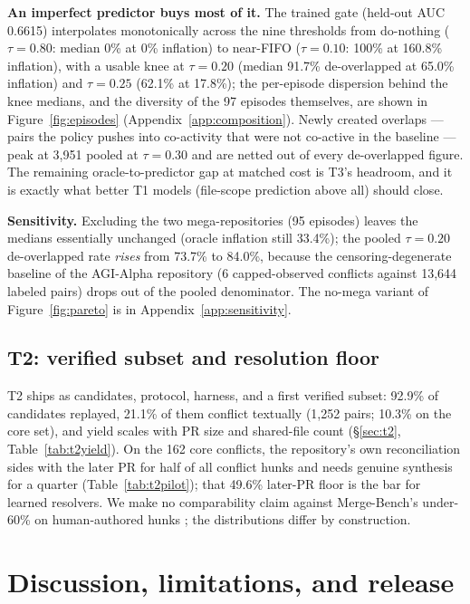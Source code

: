 \documentclass{article}
\begin{document}
\textbf{An imperfect predictor buys most of it.} The trained gate (held-out AUC 0.6615) interpolates monotonically across the nine thresholds from do-nothing ($\tau{=}0.80$: median 0\% at 0\% inflation) to near-FIFO ($\tau{=}0.10$: 100\% at 160.8\% inflation), with a usable knee at $\tau{=}0.20$ (median 91.7\% de-overlapped at 65.0\% inflation) and $\tau{=}0.25$ (62.1\% at 17.8\%); the per-episode dispersion behind the knee medians, and the diversity of the 97 episodes themselves, are shown in Figure~\ref{fig:episodes} (Appendix~\ref{app:composition}). %
Newly created overlaps --- pairs the policy pushes into co-activity that were not co-active in the baseline --- peak at 3{,}951 pooled at $\tau{=}0.30$ and are netted out of every de-overlapped figure. %
The remaining oracle-to-predictor gap at matched cost is T3's headroom, and it is exactly what better T1 models (file-scope prediction above all) should close.

\textbf{Sensitivity.} Excluding the two mega-repositories (95 episodes) leaves the medians essentially unchanged (oracle inflation still 33.4\%); the pooled $\tau{=}0.20$ de-overlapped rate \emph{rises} from 73.7\% to 84.0\%, because the censoring-degenerate baseline of the AGI-Alpha repository (6 capped-observed conflicts against 13{,}644 labeled pairs) drops out of the pooled denominator. %
The no-mega variant of Figure~\ref{fig:pareto} is in Appendix~\ref{app:sensitivity}.

\subsection{T2: verified subset and resolution floor}
T2 ships as candidates, protocol, harness, and a first verified subset: 92.9\% of candidates replayed, 21.1\% of them conflict textually (1{,}252 pairs; 10.3\% on the core set), and yield scales with PR size and shared-file count (\S\ref{sec:t2}, Table~\ref{tab:t2yield}). On the 162 core conflicts, the repository's own reconciliation sides with the later PR for half of all conflict hunks and needs genuine synthesis for a quarter (Table~\ref{tab:t2pilot}); that 49.6\% later-PR floor is the bar for learned resolvers. We make no comparability claim against Merge-Bench's under-60\% on human-authored hunks \citep{schesch2026mergebench}; the distributions differ by construction.

\section{Discussion, limitations, and release}
\label{sec:discussion}
\end{document}
